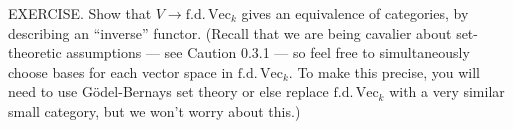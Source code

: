 EXERCISE. Show that $V \to \mathrm{f.d.}\,\mathrm{Vec}_k$ gives an equivalence of categories, by describing an “inverse” functor. (Recall that we are being cavalier about set-theoretic assumptions — see Caution 0.3.1 — so feel free to simultaneously choose bases for each vector space in $\mathrm{f.d.}\,\mathrm{Vec}_k$. To make this precise, you will need to use Gödel-Bernays set theory or else replace $\mathrm{f.d.}\,\mathrm{Vec}_k$ with a very similar small category, but we won’t worry about this.)
